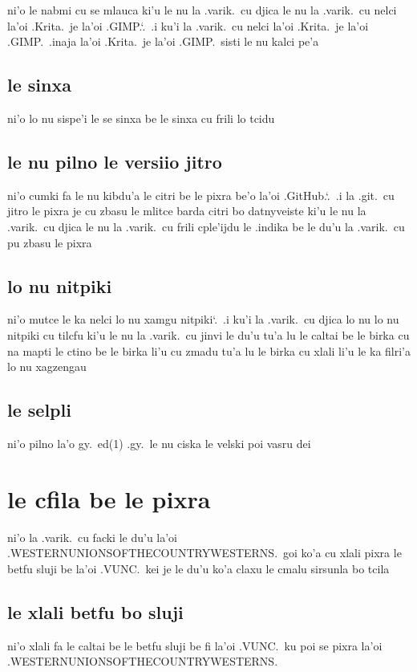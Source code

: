 \documentclass{report}
\newcommand\sds{\spacefactor\sfcode`.\ \space}
\begin{document}
ni'o le nabmi cu se mlauca ki'u le nu la .varik.\ cu djica le nu la .varik.\ cu nelci la'oi .Krita.\ je la'oi .GIMP.\sds  .i ku'i la .varik.\ cu nelci la'oi .Krita.\ je la'oi .GIMP.\  .inaja la'oi .Krita.\ je la'oi .GIMP.\ sisti le nu kalci pe'a

\subsection{le sinxa}
ni'o lo nu sispe'i le se sinxa be le sinxa cu frili lo tcidu

\subsection{le nu pilno le versiio jitro}
ni'o cumki fa le nu kibdu'a le citri be le pixra be'o la'oi .GitHub.\sds  .i la .git.\ cu jitro le pixra je cu zbasu le mlitce barda citri bo datnyveiste ki'u le nu la .varik.\ cu djica le nu la .varik.\ cu frili cple'ijdu le .indika be le du'u la .varik.\ cu pu zbasu le pixra

\subsection{lo nu nitpiki}
ni'o mutce le ka nelci lo nu xamgu nitpiki\sds  .i ku'i la .varik.\ cu djica lo nu lo nu nitpiki cu tilcfu ki'u le nu la .varik.\ cu jinvi le du'u tu'a lu le caltai be le birka cu na mapti le ctino be le birka li'u cu zmadu tu'a lu le birka cu xlali li'u le ka filri'a lo nu xagzengau

\subsection{le selpli}
ni'o pilno la'o gy.\ ed(1) .gy.\ le nu ciska le velski poi vasru dei

\section{le cfila be le pixra}
ni'o la .varik.\ cu facki le du'u la'oi .WESTERNUNIONSOFTHECOUNTRYWESTERNS.\ goi ko'a cu xlali pixra le betfu sluji be la'oi .VUNC.\ kei je le du'u ko'a claxu le cmalu sirsunla bo tcila

\subsection{le xlali betfu bo sluji}
ni'o xlali fa le caltai be le betfu sluji be fi la'oi .VUNC.\ ku poi se pixra la'oi .WESTERNUNIONSOFTHECOUNTRYWESTERNS.
\end{document}
